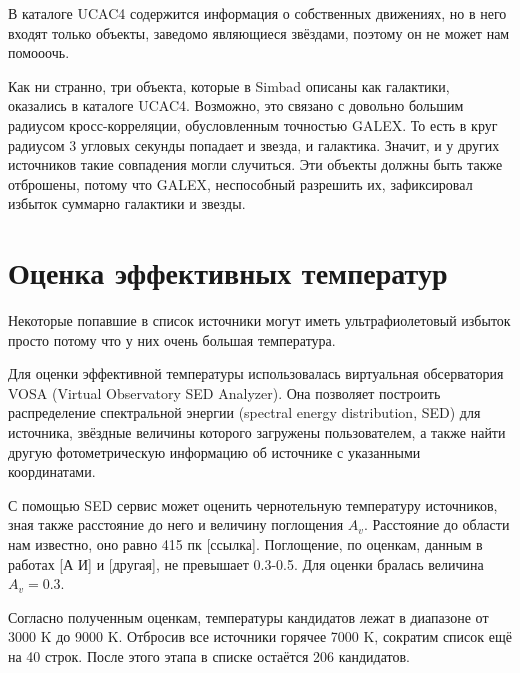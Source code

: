 В каталоге UCAC4 содержится информация о собственных движениях, но в него входят только объекты, заведомо являющиеся звёздами, поэтому он не может нам помооочь.

Как ни странно, три объекта, которые в Simbad описаны как галактики, оказались в каталоге UCAC4. Возможно, это связано с довольно большим радиусом кросс-корреляции, обусловленным точностью GALEX. То есть в круг радиусом 3 угловых секунды попадает и звезда, и галактика. Значит, и у других источников такие совпадения могли случиться. Эти объекты должны быть также отброшены, потому что GALEX, неспособный разрешить их, зафиксировал избыток суммарно галактики и звезды.

\section{Оценка эффективных температур}
Некоторые попавшие в список источники могут иметь ультрафиолетовый избыток просто потому что у них очень большая температура. 

Для оценки эффективной температуры использовалась виртуальная обсерватория VOSA (Virtual Observatory SED Analyzer). Она позволяет построить распределение спектральной энергии (spectral energy distribution, SED) для источника, звёздные величины которого загружены пользователем, а также найти другую фотометрическую информацию об источнике с указанными координатами.

С помощью SED сервис может оценить чернотельную температуру источников, зная также расстояние до него и величину поглощения $A_v$. Расстояние до области нам известно, оно равно 415 пк [ссылка]. Поглощение, по оценкам, данным в работах [А И] и [другая], не превышает 0.3-0.5. Для оценки бралась величина $A_v=0.3$.

Согласно полученным оценкам, температуры кандидатов лежат в диапазоне от 3000 K до 9000 K. Отбросив все источники горячее 7000 K, сократим список ещё на 40 строк. После этого этапа в списке остаётся 206 кандидатов.



